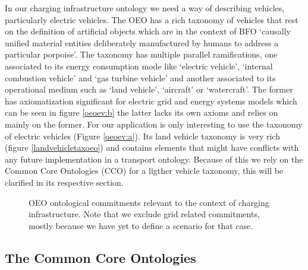 In our charging infrastructure ontology we need a way of describing vehicles,
particularly electric vehicles. The OEO has a rich taxonomy of vehicles that
rest on the definition of artificial objects which are in the context of BFO
`causally unified material entities deliberately manufactured by humans to
address a particular porpoise'. The taxonomy has multiple parallel
ramifications, one associated to its energy consumption mode like `electric
vehicle', `internal combustion vehicle' and `gas turbine vehicle' and another
associated to its operational medium such as `land vehicle', `aircraft' or
`watercraft'. The former has axiomatization significant for electric grid and
energy systems models which can be seen in figure \ref{oeoev:b} the latter
lacks its own axioms and relies on mainly on the former. For our application is
only interesting to use the taxonomy of electric vehicles (Figure
\ref{oeoev:a}). Its land vehicle taxonomy is very rich (figure
\ref{landvehicletaxoeo}) and contains elements that might have conflicts with
any future implementation in a transport ontology. Because of this we rely on
the Common Core Ontologies (CCO) for a ligther vehicle taxonomy, this will be
clarified in its respective section.

\begin{figure}
    \centering
    \caption{OEO ontological commitments relevant to the context of charging infrastructure. Note that we exclude grid related commitments, mostly because we have yet to define a scenario for that case.}
\end{figure}

\subsection{The Common Core Ontologies}

